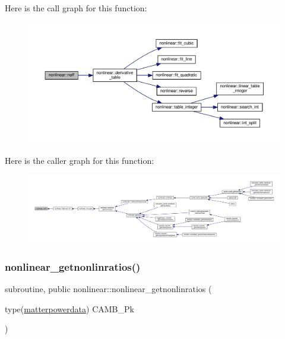 Here is the call graph for this function\+:
\nopagebreak
\begin{figure}[H]
\begin{center}
\leavevmode
\includegraphics[width=350pt]{namespacenonlinear_a94503cd59bd5a206379a0c13afe89ffc_cgraph}
\end{center}
\end{figure}
Here is the caller graph for this function\+:
\nopagebreak
\begin{figure}[H]
\begin{center}
\leavevmode
\includegraphics[width=350pt]{namespacenonlinear_a94503cd59bd5a206379a0c13afe89ffc_icgraph}
\end{center}
\end{figure}
\mbox{\label{namespacenonlinear_a0ed6b8f43af3b8a2cb369df5c247ca1f}} 
\subsubsection{\texorpdfstring{nonlinear\+\_\+getnonlinratios()}{nonlinear\_getnonlinratios()}}
{\footnotesize\ttfamily subroutine, public nonlinear\+::nonlinear\+\_\+getnonlinratios (\begin{DoxyParamCaption}\item[{type(\mbox{\hyperlink{structtransfer_1_1matterpowerdata}{matterpowerdata}})}]{C\+A\+M\+B\+\_\+\+Pk }\end{DoxyParamCaption})}



